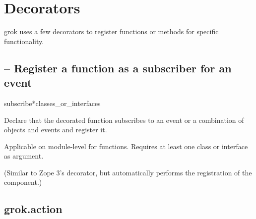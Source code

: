 \chapter{Decorators}

grok uses a few decorators to register functions or methods for specific
functionality.

    \section{ -- Register a function as a subscriber
    for an event}

        \begin{funcdesc}{subscribe}{*classes_or_interfaces}

        Declare that the decorated function subscribes to an event or a
        combination of objects and events and register it.

        Applicable on module-level for functions. Requires at least one class
        or interface as argument.

        (Similar to Zope 3's  decorator, but automatically
        performs the registration of the component.)
        \end{funcdesc}

    \section{grok.action}
